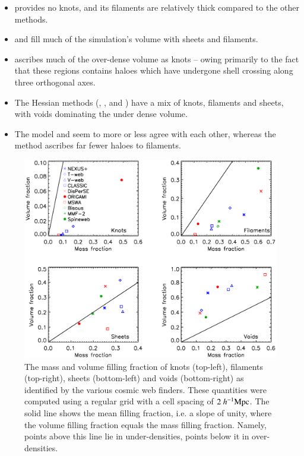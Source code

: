 \begin{itemize}
\item \disperse{} provides no knots, and its filaments are relatively thick compared to the other methods.
\item \mmft{} and \spine{} fill much of the simulation's volume with sheets and filaments.
\item \origami{} ascribes much of the over-dense volume as knots -- owing primarily to the fact that these regions contains haloes which have undergone shell crossing along three orthogonal axes.
\item The Hessian methods (\nexus{}, \tweb{}, \vweb{} and \classic{}) have a mix of knots, filaments and sheets, with voids dominating the under dense volume.
\item The \bisous{} model and \mst{} seem to more or less agree with each other, whereas the \fine{} method ascribes far fewer haloes to filaments.
\end{itemize} 

\begin{figure}
\begin{minipage}[t]{.99\linewidth}

 \includegraphics[width=\textwidth]{Chapter3b/FIGS/vff-mff}
 \vspace{-.7cm}
 \end{minipage}\hfill

 \caption{ The mass and volume filling fraction of knots (top-left), filaments (top-right), sheets (bottom-left) and voids (bottom-right) as identified by the various cosmic web finders. These quantities were computed using a regular grid with a cell spacing of $2~h^{-1}\rm Mpc$. The solid line shows the mean filling fraction, i.e. a slope of unity, where the volume filling fraction equals the mass filling fraction. Namely, points above this line lie in under-densities, points below it in over-densities. }
 \label{fig:vff_mff}
\end{figure}

